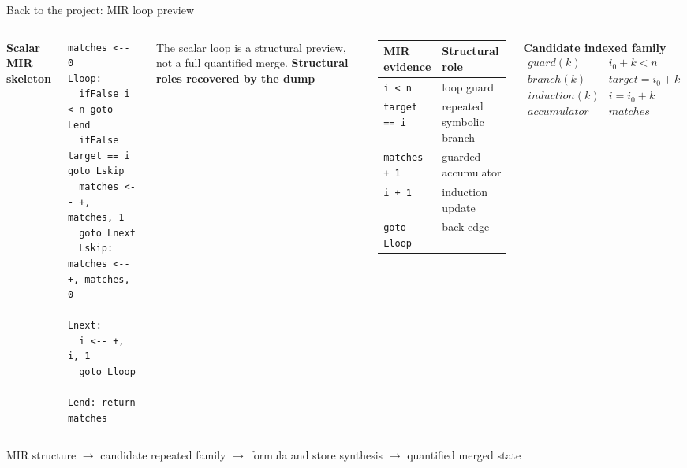\documentclass[english,aspectratio=169,t]{beamer}
\begin{document}
\begin{frame}[fragile]{Back to the project: MIR loop preview}
  \begin{columns}[T,onlytextwidth]
      \textbf{Scalar MIR skeleton}\\[-0.15em]
\begin{lstlisting}[style=mircode,basicstyle=\ttfamily\fontsize{5.3}{5.8}\selectfont]
matches <-- 0
Lloop:
  ifFalse i < n goto Lend
  ifFalse target == i goto Lskip
  matches <-- +, matches, 1
  goto Lnext
  Lskip: matches <-- +, matches, 0

Lnext:
  i <-- +, i, 1
  goto Lloop

Lend: return matches
\end{lstlisting}
      \vspace{0.1em}
      {\scriptsize The scalar loop is a structural preview, not a full quantified merge.}
      \textbf{Structural roles recovered by the dump}\\[-0.15em]
      \begin{center}
      \scriptsize
      \begin{tabular}{|l|l|}
        \hline
        MIR evidence & Structural role\\
        \hline
        \texttt{i < n} & loop guard\\
        \hline
        \texttt{target == i} & repeated symbolic branch\\
        \hline
        \texttt{matches + 1} & guarded accumulator\\
        \hline
        \texttt{i + 1} & induction update\\
        \hline
        \texttt{goto Lloop} & back edge\\
        \hline
      \end{tabular}
      \end{center}

      \vspace{-0.25em}
      \textbf{Candidate indexed family}\\[-0.4em]
      {\scriptsize
      \[
      \begin{array}{ll}
      guard(k) & i_0+k<n\\
      branch(k) & target=i_0+k\\
      induction(k) & i=i_0+k\\
      accumulator & matches
      \end{array}
      \]
      }
  \end{columns}

  \vspace{-0.5em}
  \begin{center}
    \scriptsize
    MIR structure $\rightarrow$ candidate repeated family $\rightarrow$ formula and store synthesis $\rightarrow$ quantified merged state
  \end{center}
\end{frame}
\end{document}
